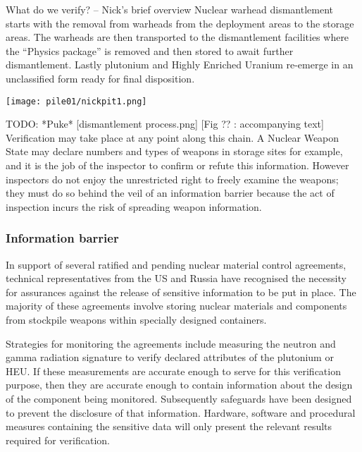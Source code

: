 \documentclass[twoside,titlepage,11pt,twocolumn,a4paper]{article}
\begin{document}
What do we verify? -- Nick’s brief overview Nuclear warhead
dismantlement starts with the removal from warheads from the
deployment areas to the storage areas. The warheads are then
transported to the dismantlement facilities where the ``Physics
package'' is removed and then stored to await further
dismantlement. Lastly plutonium and Highly Enriched Uranium re-emerge
in an unclassified form ready for final disposition.

\begin{figure*}
  \texttt{[image: pile01/nickpit1.png]}
\end{figure*}

TODO: *Puke*
[dismantlement process.png] [Fig ?? : accompanying text] \citep{IPFN2009}
Verification may take place at any
point along this chain. A Nuclear Weapon State may declare numbers and
types of weapons in storage sites for example, and it is the job of
the inspector to confirm or refute this information.  However
inspectors do not enjoy the unrestricted right to freely examine the
weapons; they must do so behind the veil of an information barrier
because the act of inspection incurs the risk of spreading weapon
information.

\subsubsection{Information barrier}
In support of several ratified and pending nuclear material control
agreements, technical representatives from the US and Russia have
recognised the necessity for assurances against the release of
sensitive information to be put in place.  The majority of these
agreements involve storing nuclear materials and components from
stockpile weapons within specially designed containers.

Strategies for monitoring the agreements include measuring the neutron
and gamma radiation signature to verify declared attributes of the
plutonium or HEU.  If these measurements are accurate enough to serve
for this verification purpose, then they are accurate enough to
contain information about the design of the component being
monitored. Subsequently safeguards have been designed to prevent the
disclosure of that information. Hardware, software and procedural
measures containing the sensitive data will only present the relevant
results required for verification.
\end{document}
